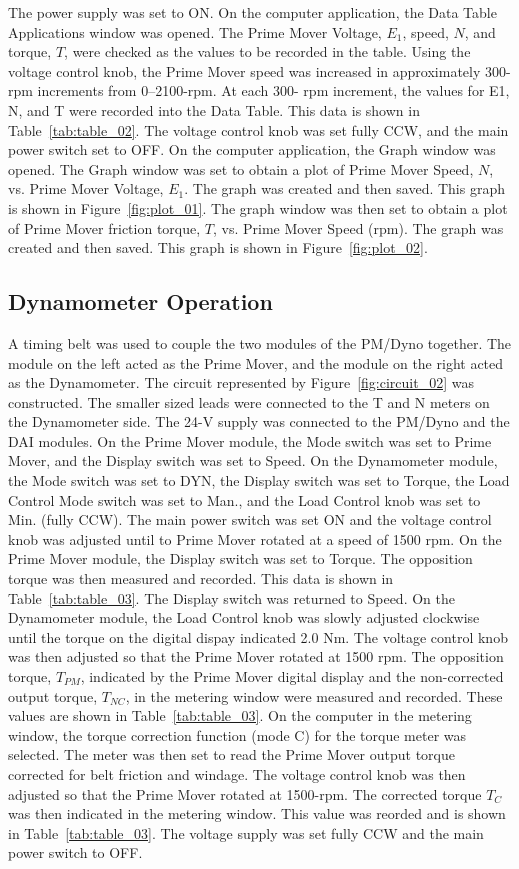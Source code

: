 \documentclass{article}
\begin{document}
The power supply was set to {ON}. On the computer application, the Data Table
Applications window was opened. The Prime Mover Voltage, $E_1$, speed, $N$, and
torque, $T$, were checked as the values to be recorded in the table. Using the
voltage control knob, the Prime Mover speed was increased in approximately
300-rpm increments from 0--2100-rpm. At each 300- rpm increment, the values for
E1, N, and T were recorded into the Data Table. This data is shown in
Table~\ref{tab:table_02}. The voltage control knob was set fully CCW, and the
main power switch set to {OFF}. On the computer application, the Graph window
was opened. The Graph window was set to obtain a plot of Prime Mover Speed,
$N$, vs.  Prime Mover Voltage, $E_1$. The graph was created and then saved.
This graph is shown in Figure~\ref{fig:plot_01}. The graph window was then set
to obtain a plot of Prime Mover friction torque, $T$, vs. Prime Mover Speed
(rpm). The graph was created and then saved. This graph is shown in
Figure~\ref{fig:plot_02}.

\subsection{Dynamometer Operation}

\label{part2} A timing belt was used to couple the two modules of the PM/Dyno
together. The module on the left acted as the Prime Mover, and the module on
the right acted as the Dynamometer. The circuit represented by
Figure~\ref{fig:circuit_02} was constructed. The smaller sized leads were
connected to the T and N meters on the Dynamometer side. The 24-V supply was
connected to the PM/Dyno and the DAI modules. On the Prime Mover module, the
Mode switch was set to Prime Mover, and the Display switch was set to Speed. On
the Dynamometer module, the Mode switch was set to DYN, the Display switch was
set to Torque, the Load Control Mode switch was set to Man., and the Load
Control knob was set to Min. (fully CCW). The main power switch was set ON and
the voltage control knob was adjusted until to Prime Mover rotated at a speed
of 1500 rpm. On the Prime Mover module, the Display switch was set to Torque.
The opposition torque was then measured and recorded. This data is shown in
Table~\ref{tab:table_03}. The Display switch was returned to Speed. On the
Dynamometer module, the Load Control knob was slowly adjusted clockwise until
the torque on the digital dispay indicated 2.0 Nm. The voltage control knob was
then adjusted so that the Prime Mover rotated at 1500 rpm. The opposition
torque, $T_{PM}$, indicated by the Prime Mover digital display and the
non-corrected output torque, $T_{NC}$, in the metering window were measured and
recorded. These values are shown in Table~\ref{tab:table_03}. On the computer
in the metering window, the torque correction function (mode C) for the torque
meter was selected. The meter was then set to read the Prime Mover output
torque corrected for belt friction and windage. The voltage control knob was
then adjusted so that the Prime Mover rotated at 1500-rpm.  The corrected
torque $T_C$ was then indicated in the metering window. This value was reorded
and is shown in Table~\ref{tab:table_03}. The voltage supply was set fully CCW
and the main power switch to OFF.
\end{document}
